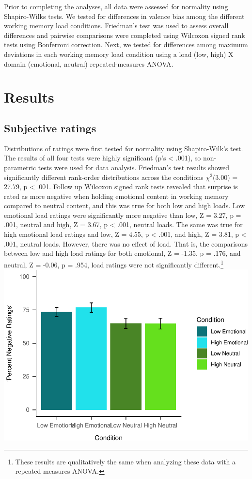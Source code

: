 \documentclass[man]{apa6}
\let\rmarkdownfootnote\footnote%
\def\footnote{\protect\rmarkdownfootnote}
\begin{document}
Prior to completing the analyses, all data were assessed for normality using Shapiro-Wilks tests. We tested for differences in valence bias among the different working memory load conditions. Friedman's test was used to assess overall differences and pairwise comparisons were completed using Wilcoxon signed rank tests using Bonferroni correction. Next, we tested for differences among maximum deviations in each working memory load condition using a load (low, high) X domain (emotional, neutral) repeated-measures ANOVA.

\hypertarget{results}{%
\section{Results}\label{results}}

\hypertarget{subjective-ratings}{%
\subsection{Subjective ratings}\label{subjective-ratings}}

Distributions of ratings were first tested for normality using Shapiro-Wilk's test. The results of all four tests were highly significant (p's \textless{} .001), so non-parametric tests were used for data analysis. Friedman's test results showed significantly different rank-order distributions across the conditions \(\chi^{2}\)(3.00) = 27.79, p \textless{} .001. Follow up Wilcoxon signed rank tests revealed that surprise is rated as more negative when holding emotional content in working memory compared to neutral content, and this was true for both low and high loads. Low emotional load ratings were significantly more negative than low, Z = 3.27, p = .001, neutral and high, Z = 3.67, p \textless{} .001, neutral loads. The same was true for high emotional load ratings and low, Z = 4.55, p \textless{} .001, and high, Z = 3.81, p \textless{} .001, neutral loads. However, there was no effect of load. That is, the comparisons between low and high load ratings for both emotional, Z = -1.35, p = .176, and neutral, Z = -0.06, p = .954, load ratings were not significantly different.\footnote{These results are qualitatively the same when analyzing these data with a repeated measures ANOVA.}
\includegraphics{Manuscript_files/figure-latex/plot figure 1-1.pdf}
\end{document}
